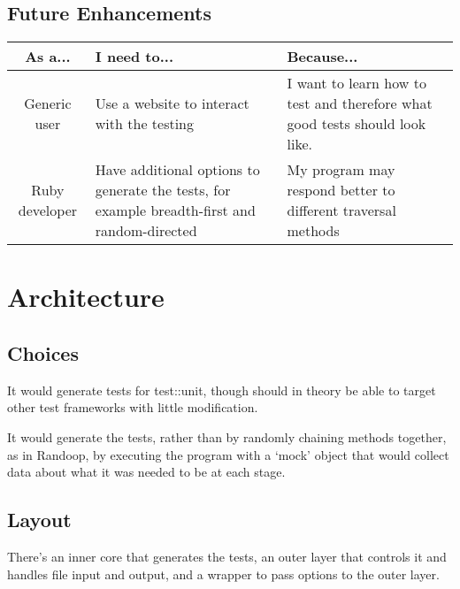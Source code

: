  \subsection{Future Enhancements}
    \begin{tabular}{| c | p{\colwidth} | p{\colwidth} |}
    \hline
    \textbf{As a...} & \textbf{I need to...} & \textbf{Because...} \\
    \hline
    Generic user &
    Use a website to interact with the testing &
    I want to learn how to test and therefore what good tests should look like. \\
    \hline
    Ruby developer &
    Have additional options to generate the tests, for example breadth-first and random-directed &
    My program may respond better to different traversal methods \\
    \hline
    \end{tabular}

\section{Architecture}

  \subsection{Choices}
    It would generate tests for test::unit, though should in theory be able to target other test frameworks with little modification.

    It would generate the tests, rather than by randomly chaining methods together, as in Randoop, by executing the program with a `mock' object that would collect data about what it was needed to be at each stage.

  \subsection{Layout}
    There's an inner core that generates the tests, an outer layer that controls it and handles file input and output, and a wrapper to pass options to the outer layer.

